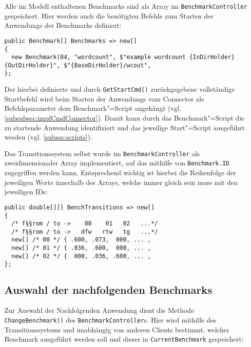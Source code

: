 Alle im Modell enthaltenen Benchmarks sind als Array im \texttt{BenchmarkController} gespeichert.
Hier werden auch die benötigten Befehle zum Starten der \glspl{Anwendung} der Benchmarks definiert:

\begin{lstlisting}[label=lst:benchmarkDefinition,style=cs,
caption={[Definition der verfügbaren Benchmarks im BenchmarkController]
    Definition der verfügbaren Benchmarks im \texttt{BenchmarkController} (gekürzt)}]
public Benchmark[] Benchmarks => new[]
{
  new Benchmark(04, "wordcount", $"example wordcount {InDirHolder} {OutDirHolder}", $"{BaseDirHolder}/wcout",
};
\end{lstlisting}

Der hierbei definierte und durch \texttt{GetStartCmd()} zurückgegebene vollständige Startbefehl wird beim Starten der \glspl{Anwendung} vom Connector als Befehlsparameter dem Benchmark"=Script angehängt (vgl. \cref{subsubsec:implCmdConnector}).
Damit kann durch das Benchmark"=Script die zu startende \gls{Anwendung} identifiziert und das jeweilige Start"=Script ausgeführt werden (vgl. \cref{subsec:scripts}).

Das Transitionssystem selbst wurde im \texttt{BenchmarkController} als zweidimensionaler Array implementiert, auf das mithilfe von \texttt{Benchmark.ID} zugegriffen werden kann.
Entsprechend wichtig ist hierbei die Reihenfolge der jeweiligen Werte innerhalb des Arrays, welche immer gleich sein muss mit den jeweiligen IDs:

\begin{lstlisting}[label=lst:transitionSystemImpl,style=cs,
caption={[Implementierung des Transitionssystems im BenchmarkController]
    Implementierung des Transitionssystems im \texttt{BenchmarkController} (gekürzt)}]
public double[][] BenchTransitions => new[]
{
  /* f§§rom / to ->    00    01   02   ...*/
  /* f§§rom / to ->   dfw   rtw   tg   ...*/
  new[] /* 00 */ { .600, .073,  000, ... ,
  new[] /* 01 */ { .036, .600,  000, ... ,
  new[] /* 02 */ {  000, .036, .600, ... ,
};
\end{lstlisting}

\subsection{Auswahl der nachfolgenden Benchmarks}
\label{subsec:selectionNextBenchmark}

Zur Auswahl der Nachfolgenden \gls{Anwendung} dient die Methode \texttt{ChangeBenchmark()} des \texttt{BenchmarkController}s.
Hier wird mithilfe des Transitionssystems und unabhängig von anderen Clients bestimmt, welcher Benchmark ausgeführt werden soll und dieser in \texttt{CurrentBenchmark} gespeichert:

